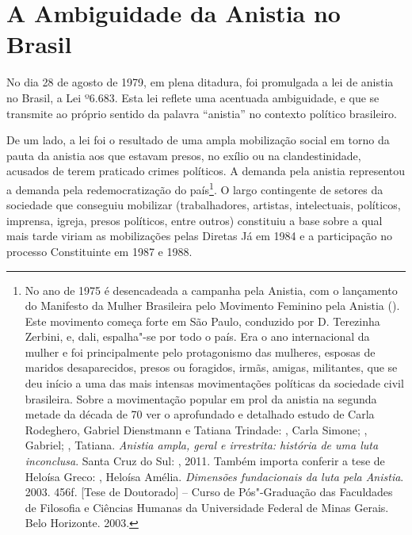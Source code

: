 \section{A Ambiguidade da Anistia no Brasil}

No dia 28 de agosto de 1979, em plena ditadura, foi promulgada a lei de
anistia no Brasil, a Lei º6.683. Esta lei reflete uma acentuada
ambiguidade, e que se transmite ao próprio sentido da palavra ``anistia''
no contexto político brasileiro.

De um lado, a lei foi o resultado de uma ampla mobilização social em
torno da pauta da anistia aos que estavam presos, no exílio ou na
clandestinidade, acusados de terem praticado crimes políticos. A demanda
pela anistia representou a demanda pela redemocratização do
país\footnote{No ano de 1975 é desencadeada a campanha pela Anistia, com
  o lançamento do Manifesto da Mulher Brasileira pelo Movimento Feminino
  pela Anistia (). Este movimento começa forte em São Paulo,
  conduzido por D. Terezinha Zerbini, e, dali, espalha"-se por
  todo o país. Era o ano internacional da mulher e foi principalmente
  pelo protagonismo das mulheres, esposas de maridos desaparecidos,
  presos ou foragidos, irmãs, amigas, militantes, que se deu início a
  uma das mais intensas movimentações políticas da sociedade civil
  brasileira. Sobre a movimentação popular em prol da anistia na segunda
  metade da década de 70 ver o aprofundado e detalhado estudo de Carla
  Rodeghero, Gabriel Dienstmann e Tatiana Trindade: , Carla
  Simone; , Gabriel; , Tatiana. \emph{Anistia ampla,
  geral e irrestrita: história de uma luta inconclusa}. Santa Cruz do
  Sul: , 2011. Também importa conferir a tese de Heloísa Greco:
  , Heloísa Amélia. \emph{Dimensões fundacionais da luta pela
  Anistia}. 2003. 456f. {[}Tese de Doutorado{]} -- Curso de
  Pós"-Graduação das Faculdades de Filosofia e Ciências Humanas da
  Universidade Federal de Minas Gerais. Belo Horizonte. 2003.}. O largo
contingente de setores da sociedade que conseguiu mobilizar
(trabalhadores, artistas, intelectuais, políticos, imprensa, igreja,
presos políticos, entre outros) constituiu a base sobre a qual mais
tarde viriam as mobilizações pelas Diretas Já em 1984 e a participação
no processo Constituinte em 1987 e 1988.

